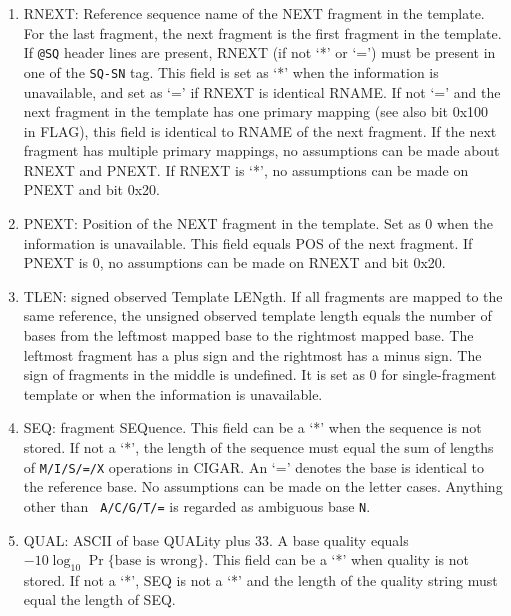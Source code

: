 \documentclass[10pt]{article}
\begin{document}
\begin{enumerate}
\begin{itemize}
  \end{itemize}
\item {\sf RNEXT}: Reference sequence name of the NEXT fragment in the
  template. For the last fragment, the next fragment is the first
  fragment in the template. If {\tt @SQ} header lines are present, {\sf
    RNEXT} (if not `*' or `=') must be present in one of the {\tt SQ-SN}
  tag. This field is set as `*' when the information is unavailable, and
  set as `=' if {\sf RNEXT} is identical {\sf RNAME}. If not `=' and the
  next fragment in the template has one primary mapping (see also bit
  0x100 in {\sf FLAG}), this field is identical to {\sf RNAME} of the
  next fragment.  If the next fragment has multiple primary mappings, no
  assumptions can be made about {\sf RNEXT} and {\sf PNEXT}.  If {\sf
    RNEXT} is `*', no assumptions can be made on {\sf PNEXT} and bit
  0x20.
\item {\sf PNEXT}: Position of the NEXT fragment in the template. Set as
  0 when the information is unavailable. This field equals {\sf POS} of
  the next fragment. If {\sf PNEXT} is 0, no assumptions can be made on
  {\sf RNEXT} and bit 0x20.
\item {\sf TLEN}: signed observed Template LENgth. If all fragments are
  mapped to the same reference, the unsigned observed template length
  equals the number of bases from the leftmost mapped base to the
  rightmost mapped base. The leftmost fragment has a plus sign and the
  rightmost has a minus sign. The sign of fragments in the middle is
  undefined. It is set as 0 for single-fragment template or when the
  information is unavailable.
\item {\sf SEQ}: fragment SEQuence. This field can be a `*' when the
  sequence is not stored. If not a `*', the length of the sequence must
  equal the sum of lengths of {\tt M/I/S/=/X} operations in {\sf CIGAR}.
  An `=' denotes the base is identical to the reference base. No
  assumptions can be made on the letter cases. Anything other than {\tt
    A/C/G/T/=} is regarded as ambiguous base {\tt N}.
\item {\sf QUAL}: ASCII of base QUALity plus 33. A base quality equals
  $-10\log_{10}\Pr\{\mbox{base is wrong}\}$. This field can be a `*'
  when quality is not stored. If not a `*', {\sf SEQ} is not a `*' and
  the length of the quality string must equal the length of {\sf SEQ}.
\end{enumerate}
\end{document}
